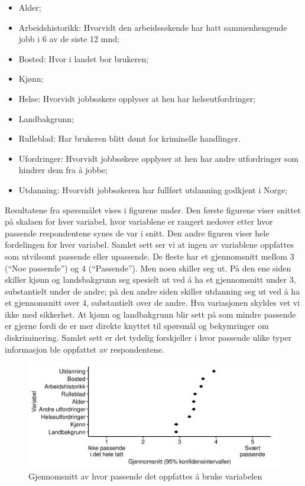 \documentclass[
  12pt,
  a4paper, 12pt]{article}
\providecommand{\tightlist}{%
  \setlength{\itemsep}{0pt}\setlength{\parskip}{0pt}}
\begin{document}
\begin{itemize}
\tightlist
\item
  Alder;
\item
  Arbeidshistorikk: Hvorvidt den arbeidssøkende har hatt sammenhengende jobb i 6 av de siste 12 mnd;
\item
  Bosted: Hvor i landet bor brukeren;
\item
  Kjønn;
\item
  Helse: Hvorvidt jobbsøkere opplyser at hen har helseutfordringer;
\item
  Landbakgrunn;
\item
  Rulleblad: Har brukeren blitt dømt for kriminelle handlinger.
\item
  Ufordringer: Hvorvidt jobbsøkere opplyser at hen har andre utfordringer som hindrer dem fra å jobbe;
\item
  Utdanning: Hvorvidt jobbsøkeren har fullført utdanning godkjent i Norge;
\end{itemize}

Resultatene fra spørsmålet vises i figurene under.
Den første figurene viser snittet på skalaen for hver variabel, hvor variablene er rangert nedover etter hvor passende respondentene synes de var i snitt. Den andre figuren viser hele fordelingen for hver variabel. Samlet sett ser vi at ingen av variablene oppfattes som utvilsomt passende eller upassende. De fleste har et gjennomsnitt mellom 3 (``Noe passende'') og 4 (``Passende''). Men noen skiller seg ut. På den ene siden skiller kjønn og landsbakgrunn seg spesielt ut ved å ha et gjennomsnitt under 3, substantielt under de andre; på den andre siden skiller utdanning seg ut ved å ha et gjennomsnitt over 4, substantielt over de andre. Hva variasjonen skyldes vet vi ikke med sikkerhet. At kjønn og landbakgrunn blir sett på som mindre passende er gjerne fordi de er mer direkte knyttet til spørsmål og bekymringer om diskriminering. Samlet sett er det tydelig forskjeller i hvor passende ulike typer informasjon ble oppfattet av respondentene.

\begin{figure}

{\centering \includegraphics[width=0.9\linewidth]{figs/png/fig_vars_avg} 

}

\caption{Gjennomsnitt av hvor passende det oppfattes å bruke variabelen}\label{fig:unnamed-chunk-25}
\end{figure}
\end{document}

